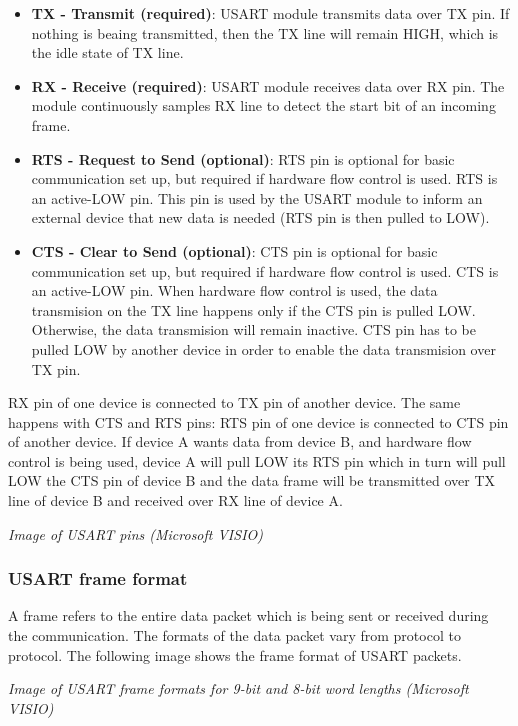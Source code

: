 \begin{itemize}
	\item	\textbf{TX - Transmit (required)}: USART module transmits data over TX pin. If nothing is beaing transmitted, then the TX line will remain HIGH, which is the idle state of TX line.
	\item	\textbf{RX - Receive (required)}: USART module receives data over RX pin. The module continuously samples RX line to detect the start bit of an incoming frame.
	\item	\textbf{RTS - Request to Send (optional)}: RTS pin is optional for basic communication set up, but required if hardware flow control is used. RTS is an active-LOW pin. This pin is used by the USART module to inform an external device that new data is needed (RTS pin is then pulled to LOW).
	\item	\textbf{CTS - Clear to Send (optional)}: CTS pin is optional for basic communication set up, but required if hardware flow control is used. CTS is an active-LOW pin. When hardware flow control is used, the data transmision on the TX line happens only if the CTS pin is pulled LOW. Otherwise, the data transmision will remain inactive. CTS pin has to be pulled LOW by another device in order to enable the data transmision over TX pin.
\end{itemize}

\noindent RX pin of one device is connected to TX pin of another device. The same happens with CTS and RTS pins: RTS pin of one device is connected to CTS pin of another device. If device A wants data from device B, and hardware flow control is being used, device A will pull LOW its RTS pin which in turn will pull LOW the CTS pin of device B and the data frame will be transmitted over TX line of device B and received over RX line of device A.

\begin{center}
\textit{Image of USART pins (Microsoft VISIO)}
\end{center}

\subsubsection{USART frame format}
A frame refers to the entire data packet which is being sent or received during the communication. The formats of the data packet vary from protocol to protocol. The following image shows the frame format of USART packets.

\begin{center}
\textit{Image of USART frame formats for 9-bit and 8-bit word lengths (Microsoft VISIO)}
\end{center}

